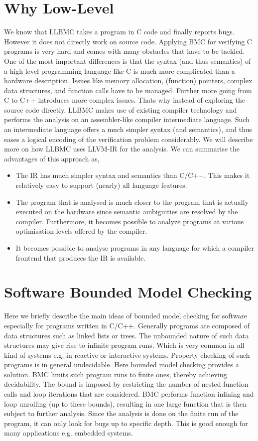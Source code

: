 \documentclass[14pt]{article}
\begin{document}
\section{Why Low-Level}\label{Low-Level}
We know that LLBMC takes a program in C code and finally reports bugs. However it does not directly work on source code. Applying BMC for verifying C programs is very hard and comes with many obstacles that have to be tackled. One of the most important differences is that the syntax (and thus semantics) of a high level programming language like C is much more complicated than a hardware description. Issues like memory allocation, (function) pointers, complex data structures, and function calls have to be managed. Further more going from C to C++ introduces more complex issues. Thats why instead of exploring the source code directly, LLBMC makes use of existing compiler technology and performs the analysis on an assembler-like compiler intermediate language. Such an intermediate language offers a much simpler syntax (and semantics), and thus eases a logical encoding of the verification problem considerably. We will describe more on how LLBMC uses LLVM-IR for the analysis. We can summarise the advantages of this approach as,
\begin{itemize}
   \item The IR has much simpler syntax and semantics than C/C++. This makes it relatively easy to support (nearly) all language features.
     \item The program that is analysed is much closer to the program that is actually executed on the hardware since semantic ambiguities are resolved by the compiler. Furthermore, it becomes possible to analyze programs at various optimisation levels offered by the compiler.
  \item It becomes possible to analyse programs in any language for which a compiler frontend that produces the IR is available.
  
\end{itemize}

\section{Software Bounded Model Checking}\label{Software Bounded Model Checking}
Here we briefly describe the main ideas of bounded model checking for software especially for programs written in C/C++. Generally programs are composed of data structures such as linked lists or trees. The unbounded nature of such data structures may give rise to infinite program runs. Which is very common in all kind of systems e.g.  in reactive or interactive systems.  Property checking of such programs is in general undecidable.  Here bounded model checking provides a solution. BMC limits such program runs to finite ones, thereby achieving decidability. The bound is imposed by restricting the number of nested function calls and loop iterations that are considered. BMC performs function inlining and loop unrolling (up to these bounds), resulting in one large function that is then subject to further analysis. Since the analysis is done on the finite run of the program, it  can only look for bugs up to specific depth. This is good enough for many applications e.g. embedded systems. 
\end{document}
